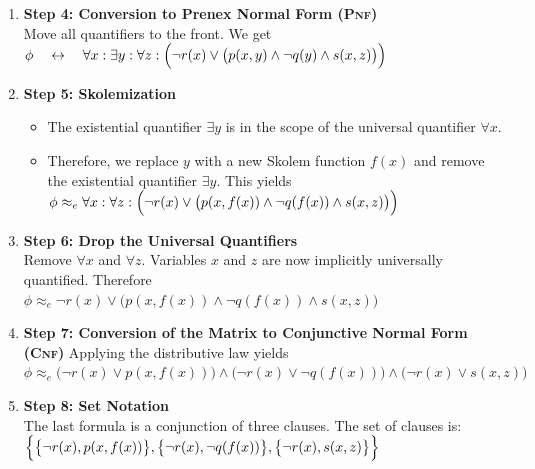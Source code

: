 \begin{enumerate}
\item \textbf{Step 4: Conversion to Prenex Normal Form (\textsc{Pnf})} \\
      Move all quantifiers to the front. We get
      \\[0.2cm]
      \hspace*{1.3cm}
      $\phi \quad\leftrightarrow\quad
       \forall x: \exists y: \forall z: \Bigl(\neg r(x) \lor \bigl(p(x,y) \land \neg q(y) \land s(x,z)\bigr)\Bigr)$
    \item \textbf{Step 5: Skolemization}
    \begin{itemize}
        \item The existential quantifier $\exists y$ is in the scope of the universal quantifier $\forall x$.
        \item Therefore, we replace $y$ with a new Skolem function $f(x)$ and remove the existential quantifier
          $\exists y$.   This yields
          \\[0.2cm]
          \hspace*{1.3cm}
          $\phi \approx_e \forall x: \forall z: \Bigl(\neg r(x) \lor \bigl(p(x,f(x)) \land \neg q(f(x)) \land s(x,z)\bigr)\Bigr)$
       \end{itemize}
  \item \textbf{Step 6: Drop the Universal Quantifiers} \\
    Remove $\forall x$ and $\forall z$. Variables $x$ and $z$ are now implicitly universally quantified.  Therefore
    \\[0.2cm]
    \hspace*{1.3cm}
    $\phi \approx_e \neg r(x) \lor \bigl(p(x,f(x)) \land \neg q(f(x)) \land s(x,z)\bigr)$ 

    \item \textbf{Step 7: Conversion of the Matrix to Conjunctive Normal Form (\textsc{Cnf})} 
          Applying the distributive law yields 
          \\[0.2cm]
          \hspace*{1.3cm}
    $\phi \approx_e \bigl(\neg r(x) \lor p(x,f(x))\bigr) \land \bigl(\neg r(x) \lor \neg q(f(x))\bigr) \land \bigl(\neg r(x) \lor s(x,z)\bigr)$

    \item \textbf{Step 8: Set Notation} \\
    The last formula  is a conjunction of three clauses. The set of clauses is: 
    \\[0.2cm]
    \hspace*{1.3cm}
    $\Bigl\{\bigl\{\neg r(x), p(x,f(x))\bigr\}, \bigl\{\neg r(x), \neg q(f(x))\bigr\}, \bigl\{\neg r(x), s(x,z)\bigl\} \Bigl\}$
\end{enumerate}

